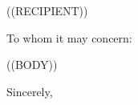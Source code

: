 \documentclass{letter}
\begin{document}
\begin{letter}{((RECIPIENT))}
\opening{To whom it may concern:}
((BODY))
\closing{Sincerely,}
\end{letter}
\end{document}
